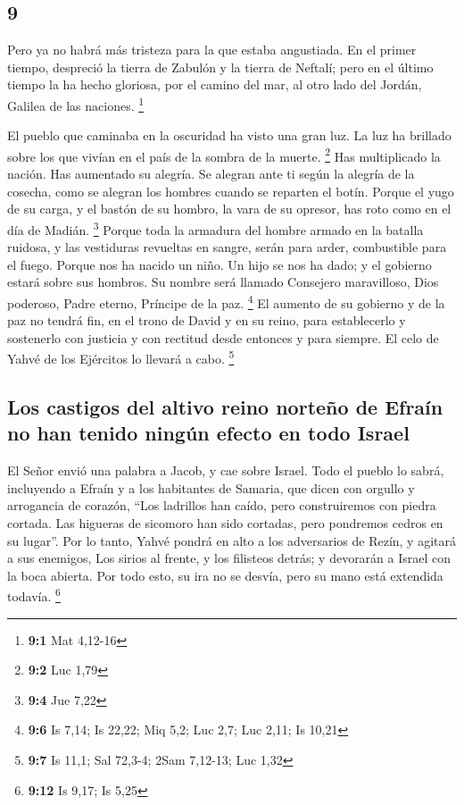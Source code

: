 \begin{paracol}{2}
\hypertarget{section-16}{%
\section{9}\label{section-16}}

 Pero ya no habrá más tristeza para la que estaba
angustiada. En el primer tiempo, despreció la tierra de Zabulón y la
tierra de Neftalí; pero en el último tiempo la ha hecho gloriosa, por el
camino del mar, al otro lado del Jordán, Galilea de las naciones.
\footnote{\textbf{9:1} Mat 4,12-16}

 El pueblo que caminaba en la oscuridad ha visto una gran
luz. La luz ha brillado sobre los que vivían en el país de la sombra de
la muerte. \footnote{\textbf{9:2} Luc 1,79}  Has
multiplicado la nación. Has aumentado su alegría. Se alegran ante ti
según la alegría de la cosecha, como se alegran los hombres cuando se
reparten el botín.  Porque el yugo de su carga, y el
bastón de su hombro, la vara de su opresor, has roto como en el día de
Madián. \footnote{\textbf{9:4} Jue 7,22}  Porque toda la
armadura del hombre armado en la batalla ruidosa, y las vestiduras
revueltas en sangre, serán para arder, combustible para el fuego.
 Porque nos ha nacido un niño. Un hijo se nos ha dado; y
el gobierno estará sobre sus hombros. Su nombre será llamado Consejero
maravilloso, Dios poderoso, Padre eterno, Príncipe de la paz.
\footnote{\textbf{9:6} Is 7,14; Is 22,22; Miq 5,2; Luc 2,7; Luc 2,11; Is
  10,21}  El aumento de su gobierno y de la paz no tendrá
fin, en el trono de David y en su reino, para establecerlo y sostenerlo
con justicia y con rectitud desde entonces y para siempre. El celo de
Yahvé de los Ejércitos lo llevará a cabo. \footnote{\textbf{9:7} Is
  11,1; Sal 72,3-4; 2Sam 7,12-13; Luc 1,32}

\hypertarget{los-castigos-del-altivo-reino-norteuxf1o-de-efrauxedn-no-han-tenido-ninguxfan-efecto-en-todo-israel}{%
\subsection{Los castigos del altivo reino norteño de Efraín no han
tenido ningún efecto en todo
Israel}\label{los-castigos-del-altivo-reino-norteuxf1o-de-efrauxedn-no-han-tenido-ninguxfan-efecto-en-todo-israel}}

 El Señor envió una palabra a Jacob, y cae sobre Israel.
 Todo el pueblo lo sabrá, incluyendo a Efraín y a los
habitantes de Samaria, que dicen con orgullo y arrogancia de corazón,
 ``Los ladrillos han caído, pero construiremos con piedra
cortada. Las higueras de sicomoro han sido cortadas, pero pondremos
cedros en su lugar''.  Por lo tanto, Yahvé pondrá en alto
a los adversarios de Rezín, y agitará a sus enemigos, 
Los sirios al frente, y los filisteos detrás; y devorarán a Israel con
la boca abierta. Por todo esto, su ira no se desvía, pero su mano está
extendida todavía. \footnote{\textbf{9:12} Is 9,17; Is 5,25}


\end{paracol}
